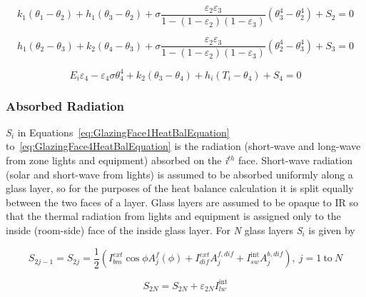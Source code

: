 \begin{equation}
{k_1}\left( {{\theta_1} - {\theta_2}} \right) + {h_1}\left( {{\theta_3} - {\theta_2}} \right) + \sigma \frac{{{\varepsilon_2}{\varepsilon_3}}}{{1 - \left( {1 - {\varepsilon_2}} \right)\left( {1 - {\varepsilon_3}} \right)}}\left( {\theta_3^4 - \theta_2^4} \right) + {S_2} = 0
\end{equation}

\begin{equation}
{h_1}({\theta_2} - {\theta_3}) + {k_2}({\theta_4} - {\theta_3}) + \sigma \frac{{{\varepsilon_2}{\varepsilon_3}}}{{1 - \left( {1 - {\varepsilon_2}} \right)\left( {1 - {\varepsilon_3}} \right)}}\left( {\theta_2^4 - \theta_3^4} \right) + {S_3} = 0
\end{equation}

\begin{equation}
{E_i}{\varepsilon_4} - {\varepsilon_4}\sigma \theta_4^4 + {k_2}\left( {{\theta_3} - {\theta_4}} \right) + {h_i}\left( {{T_i} - {\theta_4}} \right) + {S_4} = 0
\label{eq:GlazingFace4HeatBalEquation}
\end{equation}

\subsubsection{Absorbed Radiation}\label{absorbed-radiation}

\emph{S\(_{i}\)} in Equations~\ref{eq:GlazingFace1HeatBalEquation} to~\ref{eq:GlazingFace4HeatBalEquation} is the radiation (short-wave and long-wave from zone lights and equipment) absorbed on the \emph{i}\(^{th}\) face. Short-wave radiation (solar and short-wave from lights) is assumed to be absorbed uniformly along a glass layer, so for the purposes of the heat balance calculation it is split equally between the two faces of a layer. Glass layers are assumed to be opaque to IR so that the thermal radiation from lights and equipment is assigned only to the inside (room-side) face of the inside glass layer. For \emph{N} glass layers \emph{S\(_{i}\)} is given by

\begin{equation}
{S_{2j - 1}} = {S_{2j}} = \frac{1}{2}\left( {I_{bm}^{ext}\cos \phi A_j^f(\phi ) + I_{dif}^{ext}A_j^{f,dif} + I_{sw}^{{\mathop\mathrm{int}} }A_j^{b,dif}} \right),{\mathrm{    ~}}j = 1{\mathrm{~to~}}N
\end{equation}

\begin{equation}
{S_{2N}} = {S_{2N}} + {\varepsilon_{2N}}I_{lw}^{{\mathop\mathrm{int}} }
\end{equation}

